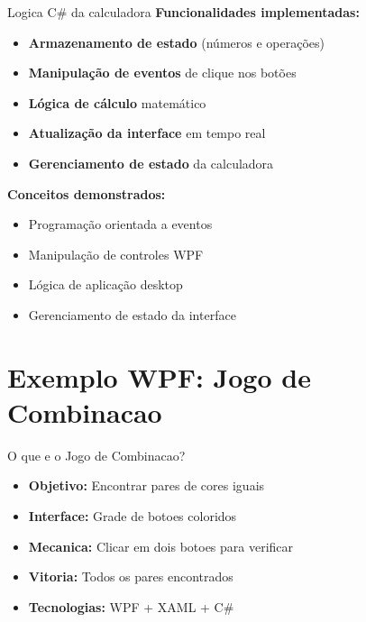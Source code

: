\documentclass[aspectratio=169]{beamer}
\begin{document}
\begin{frame}{Logica C\# da calculadora}
\textbf{Funcionalidades implementadas:}
\begin{itemize}
    \item \textbf{Armazenamento de estado} (números e operações)
    \item \textbf{Manipulação de eventos} de clique nos botões
    \item \textbf{Lógica de cálculo} matemático
    \item \textbf{Atualização da interface} em tempo real
    \item \textbf{Gerenciamento de estado} da calculadora
\end{itemize}

\textbf{Conceitos demonstrados:}
\begin{itemize}
    \item Programação orientada a eventos
    \item Manipulação de controles WPF
    \item Lógica de aplicação desktop
    \item Gerenciamento de estado da interface
\end{itemize}
\end{frame}

\section{Exemplo WPF: Jogo de Combinacao}

\begin{frame}{O que e o Jogo de Combinacao?}
\begin{itemize}
    \item \textbf{Objetivo:} Encontrar pares de cores iguais
    \item \textbf{Interface:} Grade de botoes coloridos
    \item \textbf{Mecanica:} Clicar em dois botoes para verificar
    \item \textbf{Vitoria:} Todos os pares encontrados
    \item \textbf{Tecnologias:} WPF + XAML + C\#
\end{itemize}
\end{frame}
\end{document}
